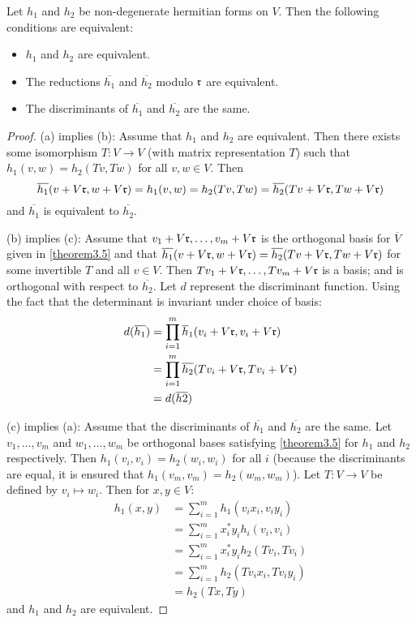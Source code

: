 \begin{corollary}\label{cor3.6}
Let $h_1$ and $h_2$ be non-degenerate hermitian forms on $V$.
Then the following conditions are equivalent:
\begin{itemize}
\item[(a)] $h_1$ and $h_2$ are equivalent.
\item[(b)] The reductions $\overline{h_1}$ and $\overline{h_2}$ modulo $\mathfrak{r}$ are equivalent.
\item[(c)] The discriminants of $\overline{h_1}$ and $\overline{h_2}$ are the same.
\end{itemize}
\end{corollary}
\begin{proof}
(a) implies (b): Assume that $h_1$ and $h_2$ are equivalent.
Then there exists some isomorphism $T: V \to V$ (with matrix representation $T$) such that $h_1(v,w) = h_2(Tv, Tw)$ for all $v, w \in V$.
Then
\[
\overline{h_1}(v + V \mathfrak{r}, w + V \mathfrak{r}) = h_1(v, w) = h_2(Tv, Tw) = \overline{h_2}(Tv + V \mathfrak{r}, Tw + V \mathfrak{r})
\]
and $\overline{h_1}$ is equivalent to $\overline{h_2}$.

(b) implies (c): Assume that $v_1 + V \mathfrak{r}, \dotsc, v_m + V \mathfrak{r}$ is the orthogonal basis for $\overline{V}$ 
given in \cref{theorem3.5} and that $\overline{h_1}(v + V\mathfrak{r}, w + V \mathfrak{r}) = \overline{h_2}(Tv + V \mathfrak{r}, Tw + V \mathfrak{r})$ 
for some invertible $T$ and all $v \in V$.
Then $T v_1 + V \mathfrak{r}, \dotsc, T v_m + V \mathfrak{r}$ is a basis; and is orthogonal with respect to $\overline{h_2}$.
Let $d$ represent the discriminant function.
Using the fact that the determinant is invariant under choice of basis:
\begin{align*}
d(\overline{h_1}) &= \prod_{i=1}^m \overline{h}_1(v_i + V \mathfrak{r}, v_i + V \mathfrak{r})\\
&= \prod_{i=1}^m \overline{h_2}(Tv_i + V \mathfrak{r}, Tv_i + V \mathfrak{r})\\ &
= d(\overline{h2})
\end{align*}

(c) implies (a): Assume that the discriminants of $\overline{h_1}$ and $\overline{h_2}$ are the same.
Let $v_1, \dotsc, v_m$ and $w_1, \dotsc, w_m$ be orthogonal bases satisfying \cref{theorem3.5} for $h_1$ and $h_2$ respectively.
Then $h_1(v_i, v_i) = h_2(w_i, w_i)$ for all $i$ (because the discriminants are equal, it is ensured that $h_1(v_m,v_m) = h_2(w_m, w_m)$).
Let $T: V \to V$ be defined by $v_i \mapsto w_i$.
Then for $x, y \in V$:
\begin{align*}
h_1(x, y) &= \sum_{i=1}^m h_1(v_i x_i, v_i y_i) \\
&= \sum_{i=1}^m x_i^* y_i h_i(v_i, v_i) \\
&= \sum_{i=1}^m x_i^*y_i h_2(Tv_i, Tv_i)\\
&= \sum_{i=1}^m h_2(Tv_i x_i, T v_i y_i)\\
&= h_2(Tx, Ty)
\end{align*}
and $h_1$ and $h_2$ are equivalent.

\end{proof}

